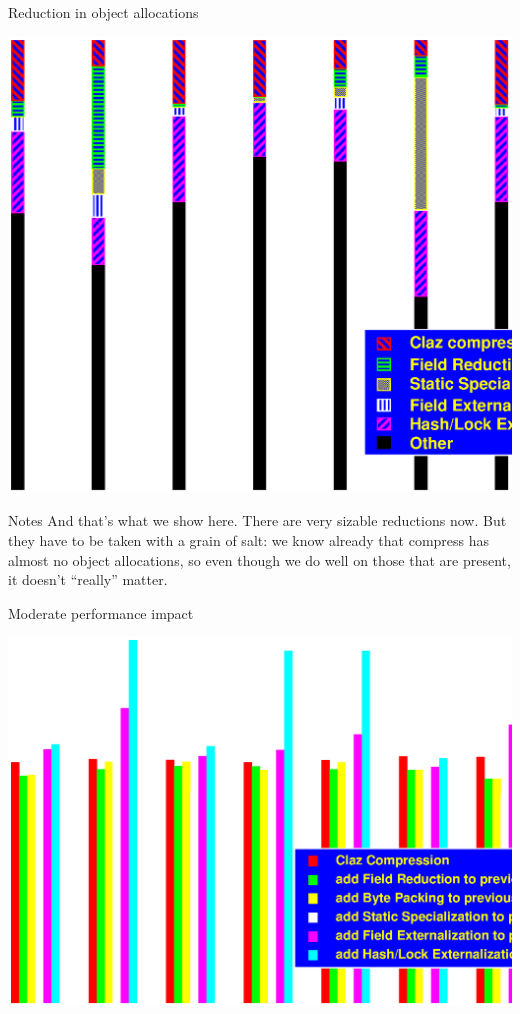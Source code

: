 \documentclass[%
pdf,
colorBG,
slideColor,
nototal,
oqe
]{prosper}
\newenvironment{talknotes}{\begin{slide}{Notes}\tiny}{\end{slide}}
\begin{document}
\begin{slide}{Reduction in object allocations}
\begin{center}
\includegraphics[scale=0.45]{Figures/oopsla-objalloc-color.eps}
\end{center}
\end{slide}

\begin{talknotes}
And that's what we show here.  There are very sizable reductions now.
But they have to be taken with a grain of salt: we know already that
compress has almost no object allocations, so even though we do well
on those that are present, it doesn't ``really'' matter.
\end{talknotes}

\begin{slide}{Moderate performance impact}
\begin{center}
\includegraphics[scale=0.45]{Figures/oopsla-speed-color.eps}
\end{center}
\end{slide}
\end{document}
